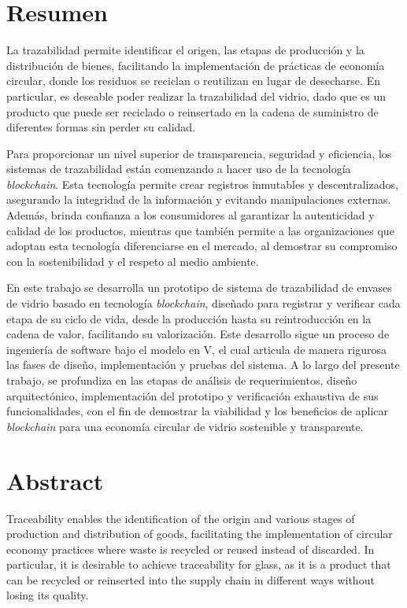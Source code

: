 \thispagestyle{plain}
\chapter*{Resumen}

La trazabilidad permite identificar el origen, las etapas de producción y la distribución de bienes, facilitando la implementación de prácticas de economía circular, donde los residuos se reciclan o reutilizan en lugar de desecharse. En particular, es deseable poder realizar la trazabilidad del vidrio, dado que es un producto que puede ser reciclado o reinsertado en la cadena de suministro de diferentes formas sin perder su calidad.

Para proporcionar un nivel superior de transparencia, seguridad y eficiencia, los sistemas de trazabilidad están comenzando a hacer uso de la tecnología \textit{blockchain}. Esta tecnología permite crear registros inmutables y descentralizados, asegurando la integridad de la información y evitando manipulaciones externas. Además, brinda confianza a los consumidores al garantizar la autenticidad y calidad de los productos, mientras que también permite a las organizaciones que adoptan esta tecnología diferenciarse en el mercado, al demostrar su compromiso con la sostenibilidad y el respeto al medio ambiente.

En este trabajo se desarrolla un prototipo de sistema de trazabilidad de envases de vidrio basado en tecnología \textit{blockchain}, diseñado para registrar y verificar cada etapa de su ciclo de vida, desde la producción hasta su reintroducción en la cadena de valor, facilitando su valorización. Este desarrollo sigue un proceso de ingeniería de software bajo el modelo en V, el cual articula de manera rigurosa las fases de diseño, implementación y pruebas del sistema. A lo largo del presente trabajo, se profundiza en las etapas de análisis de requerimientos, diseño arquitectónico, implementación del prototipo y verificación exhaustiva de sus funcionalidades, con el fin de demostrar la viabilidad y los beneficios de aplicar \textit{blockchain} para una economía circular de vidrio sostenible y transparente.

\chapter*{Abstract}

Traceability enables the identification of the origin and various stages of production and distribution of goods, facilitating the implementation of circular economy practices where waste is recycled or reused instead of discarded. In particular, it is desirable to achieve traceability for glass, as it is a product that can be recycled or reinserted into the supply chain in different ways without losing its quality.

